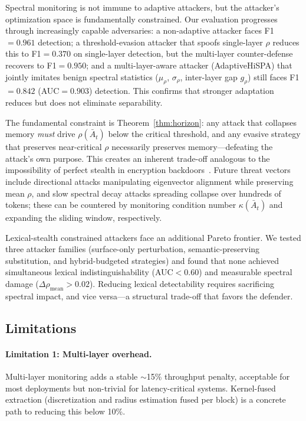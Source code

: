 \documentclass[10pt,twocolumn]{article}
\begin{document}
Spectral monitoring is not immune to adaptive attackers, but the attacker's optimization space is fundamentally constrained. Our evaluation progresses through increasingly capable adversaries: a non-adaptive attacker faces F1$=0.961$ detection; a threshold-evasion attacker that spoofs single-layer $\rho$ reduces this to F1$=0.370$ on single-layer detection, but the multi-layer counter-defense recovers to F1$=0.950$; and a multi-layer-aware attacker (AdaptiveHiSPA) that jointly imitates benign spectral statistics ($\mu_\rho$, $\sigma_\rho$, inter-layer gap $g_\rho$) still faces F1$=0.842$ (AUC$=0.903$) detection. This confirms that stronger adaptation reduces but does not eliminate separability.

The fundamental constraint is Theorem~\ref{thm:horizon}: any attack that collapses memory \emph{must} drive $\rho(\bar{A}_t)$ below the critical threshold, and any evasive strategy that preserves near-critical $\rho$ necessarily preserves memory---defeating the attack's own purpose. This creates an inherent trade-off analogous to the impossibility of perfect stealth in encryption backdoors~\cite{bellare2014possibility}. Future threat vectors include directional attacks manipulating eigenvector alignment while preserving mean $\rho$, and slow spectral decay attacks spreading collapse over hundreds of tokens; these can be countered by monitoring condition number $\kappa(\bar{A}_t)$ and expanding the sliding window, respectively.

Lexical-stealth constrained attackers face an additional Pareto frontier. We tested three attacker families (surface-only perturbation, semantic-preserving substitution, and hybrid-budgeted strategies) and found that none achieved simultaneous lexical indistinguishability (AUC$<$0.60) and measurable spectral damage ($\Delta\rho_{\text{mean}} > 0.02$). Reducing lexical detectability requires sacrificing spectral impact, and vice versa---a structural trade-off that favors the defender.

\subsection{Limitations}

\paragraph{Limitation 1: Multi-layer overhead.}
Multi-layer monitoring adds a stable $\sim$15\% throughput penalty, acceptable for most deployments but non-trivial for latency-critical systems. Kernel-fused extraction (discretization and radius estimation fused per block) is a concrete path to reducing this below 10\%.
\end{document}
